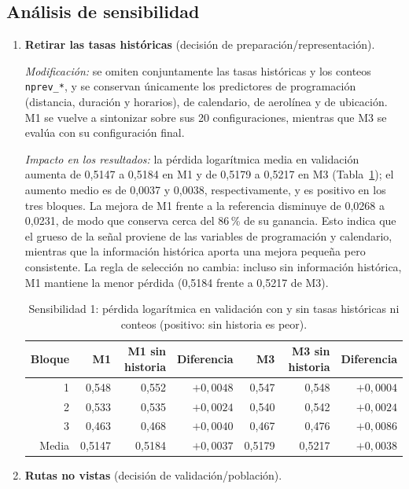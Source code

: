 \documentclass[11pt,a4paper]{article}
\begin{document}
\subsection{Análisis de sensibilidad}\label{sec:sens}
\begin{enumerate}[leftmargin=*]
  \item \textbf{Retirar las tasas históricas} (decisión de preparación/representación).
 
\emph{Modificación:} se omiten conjuntamente las tasas históricas y los conteos \texttt{nprev\_*}, y se conservan únicamente los predictores de
programación (distancia, duración y horarios), de calendario, de aerolínea y de ubicación. M1 se vuelve a sintonizar sobre sus 20 configuraciones,
mientras que M3 se evalúa con su configuración final.
 
\emph{Impacto en los resultados:} la pérdida logarítmica media en validación aumenta de 0,5147 a 0,5184 en M1 y de 0,5179 a 0,5217 en M3
(Tabla~\ref{tab:sens1}); el aumento medio es de 0,0037 y 0,0038, respectivamente, y es positivo en los tres bloques. La mejora de M1 frente a la
referencia disminuye de 0,0268 a 0,0231, de modo que conserva cerca del 86\,\% de su ganancia. Esto indica que el grueso de la señal proviene de las
variables de programación y calendario, mientras que la información histórica aporta una mejora pequeña pero consistente. La regla de selección no
cambia: incluso sin información histórica, M1 mantiene la menor pérdida (0,5184 frente a 0,5217 de M3).
 
\begin{table}[ht]
\centering\small
\begin{tabular}{rrrrrrr}
\toprule
Bloque & M1 & M1 sin historia & Diferencia & M3 & M3 sin historia & Diferencia\\
\midrule
1 & 0,548 & 0,552 & $+0{,}0048$ & 0,547 & 0,548 & $+0{,}0004$\\
2 & 0,533 & 0,535 & $+0{,}0024$ & 0,540 & 0,542 & $+0{,}0024$\\
3 & 0,463 & 0,468 & $+0{,}0040$ & 0,467 & 0,476 & $+0{,}0086$\\
Media & 0,5147 & 0,5184 & $+0{,}0037$ & 0,5179 & 0,5217 & $+0{,}0038$\\
\bottomrule
\end{tabular}
\caption{Sensibilidad 1: pérdida logarítmica en validación con y sin tasas históricas ni conteos (positivo: sin historia es peor).}
\label{tab:sens1}
\end{table}
 
  \item \textbf{Rutas no vistas} (decisión de validación/población).
 

\end{enumerate}
\end{document}

